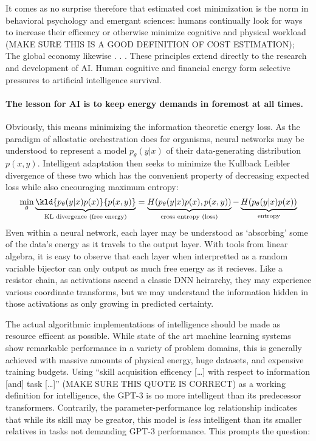 It comes as no surprise therefore that estimated cost minimization is the norm in behavioral psychology and emergant sciences: humans continually look for ways to increase their efficency or otherwise minimize cognitive and physical workload (MAKE SURE THIS IS A GOOD DEFINITION OF COST ESTIMATION); The global economy likewise . . . These principles extend directly to the research and development of AI. Human cognitive and financial energy form selective pressures to artificial intelligence survival.


\paragraph{The lesson for AI is to keep energy demands in foremost at all times.} Obviously, this means minimizing the information theoretic energy loss. As the paradigm of allostatic orchestration does for organisms, neural networks may be understood to represent a model $p_\theta(y|x)$ of their data-generating distribution $p(x,y)$. Intelligent adaptation then seeks to minimize the Kullback Leibler divergence of these two which has the convenient property of decreasing expected loss while also encouraging maximum entropy: \[\min_\theta \underbrace{ \kld{ p_\theta(y|x)p(x) }{ p(x,y) } }_{\text{KL divergence (free energy)}} = \underbrace{ H(p_\theta(y|x)p(x), p(x,y))}_{\text{cross entropy (loss)}} - \underbrace{ H(p_\theta(y|x)p(x)) }_{\text{entropy}}\] Even within a neural network, each layer may be understood as `absorbing' some of the data's energy as it travels to the output layer. With tools from linear algebra, it is easy to observe that each layer when interpretted as a random variable bijector can only output as much free energy as it recieves. Like a resistor chain, as activations ascend a classic DNN heirarchy, they may experience various coordinate transforms, but we may understand the information hidden in those activations as only growing in predicted certainty.

The actual algorithmic implementations of intelligence should be made as resource efficent as possible. While state of the art machine learning systems show remarkable performance in a variety of problem domains, this is generally achieved with massive amounts of physical energy, huge datasets, and expensive training budgets. Using ``skill acquisition efficency [\dots] with respect to information [and] task [\dots]'' (MAKE SURE THIS QUOTE IS CORRECT) as a working definition for intelligence, the GPT-3 is no more intelligent than its predecessor transformers. Contrarily, the parameter-performance log relationship indicates that while its skill may be greator, this model is \textit{less} intelligent than its smaller relatives in tasks not demanding GPT-3 performance. This prompts the question:

